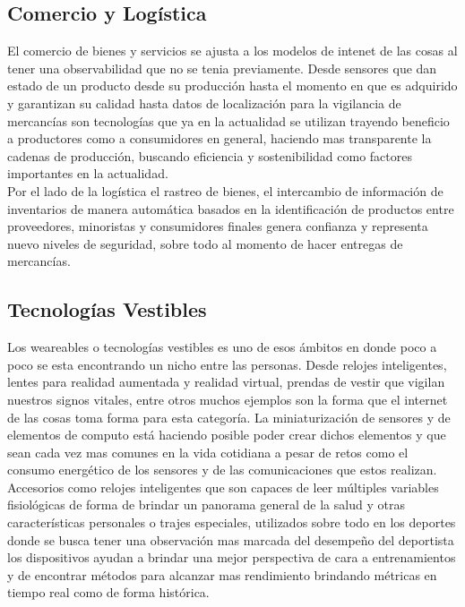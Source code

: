 \subsection{Comercio y Logística}
El comercio de bienes y servicios se ajusta a los modelos de intenet de las cosas al tener una observabilidad que no se tenia previamente. Desde sensores que dan estado de un producto desde su producción hasta el momento en que es adquirido y garantizan su calidad hasta datos de localización para la vigilancia de mercancías son tecnologías que ya en la actualidad se utilizan trayendo beneficio a productores como a consumidores en general, haciendo mas transparente la cadenas de producción, buscando eficiencia  y sostenibilidad como factores importantes en la actualidad.\\

Por el lado de la logística el rastreo de bienes, el intercambio de información de inventarios de manera automática basados en la identificación de productos entre proveedores, minoristas y consumidores finales genera confianza y representa nuevo niveles de seguridad, sobre todo al momento de hacer entregas de mercancías.

\subsection{Tecnologías Vestibles}
Los weareables o tecnologías vestibles es uno de esos ámbitos en donde poco a poco se esta encontrando un nicho entre las personas. Desde relojes inteligentes, lentes para realidad aumentada y realidad virtual, prendas de vestir que vigilan nuestros signos vitales, entre otros muchos ejemplos son la forma que el internet de las cosas toma forma para esta categoría. La miniaturización de sensores y de elementos de computo está haciendo posible poder crear dichos elementos y que sean cada vez mas comunes en la vida cotidiana a pesar de retos como el consumo energético de los sensores y de las comunicaciones que estos realizan\cite{ibmappsiot}.\\

Accesorios como relojes inteligentes que son capaces de leer múltiples variables fisiológicas de forma de brindar un panorama general de la salud y otras características personales o trajes especiales, utilizados sobre todo en los deportes donde se busca tener una observación mas marcada del desempeño del deportista los dispositivos ayudan a brindar una mejor perspectiva de cara a entrenamientos y de encontrar métodos para alcanzar mas rendimiento brindando métricas en tiempo real como de forma histórica.

